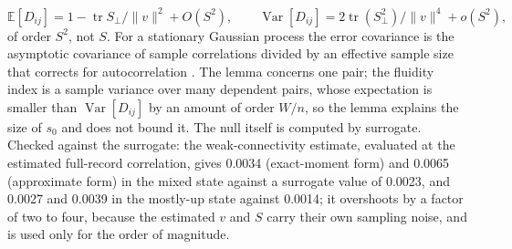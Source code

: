 \documentclass[11pt]{article}
\begin{document}
\[
\mathbb{E}[D_{ij}]=1-\operatorname{tr}S_\perp/\|v\|^{2}+O(S^{2}),\qquad \operatorname{Var}[D_{ij}]=2\operatorname{tr}(S_\perp^{2})/\|v\|^{4}+o(S^{2}),
\]
of order $S^{2}$, not $S$. For a stationary Gaussian process the error covariance is the asymptotic covariance of sample correlations \parencite{steiger1980} divided by an effective sample size that corrects for autocorrelation \parencite{bartlett1935}. The lemma concerns one pair; the fluidity index is a sample variance over many dependent pairs, whose expectation is smaller than $\operatorname{Var}[D_{ij}]$ by an amount of order $W/n$, so the lemma explains the size of $s_0$ and does not bound it. The null itself is computed by surrogate. Checked against the surrogate: the weak-connectivity estimate, evaluated at the estimated full-record correlation, gives 0.0034 (exact-moment form) and 0.0065 (approximate form) in the mixed state against a surrogate value of 0.0023, and 0.0027 and 0.0039 in the mostly-up state against 0.0014; it overshoots by a factor of two to four, because the estimated $v$ and $S$ carry their own sampling noise, and is used only for the order of magnitude.
\end{document}
